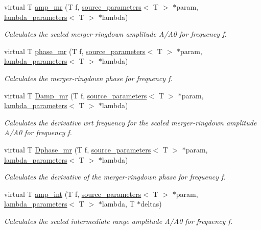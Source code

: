 \begin{DoxyCompactItemize}
virtual T \hyperlink{classIMRPhenomD_ad39d45f582ed9089b3783f7340eac615}{amp\+\_\+mr} (T f, \hyperlink{structsource__parameters}{source\+\_\+parameters}$<$ T $>$ $\ast$param, \hyperlink{structlambda__parameters}{lambda\+\_\+parameters}$<$ T $>$ $\ast$lambda)
\begin{DoxyCompactList}\small\item\em Calculates the scaled merger-\/ringdown amplitude A/\+A0 for frequency f. \end{DoxyCompactList}\item 
virtual T \hyperlink{classIMRPhenomD_a2c9c226afc991458872e36bba204f395}{phase\+\_\+mr} (T f, \hyperlink{structsource__parameters}{source\+\_\+parameters}$<$ T $>$ $\ast$param, \hyperlink{structlambda__parameters}{lambda\+\_\+parameters}$<$ T $>$ $\ast$lambda)
\begin{DoxyCompactList}\small\item\em Calculates the merger-\/ringdown phase for frequency f. \end{DoxyCompactList}\item 
virtual T \hyperlink{classIMRPhenomD_a59796cb7f1ac68684562508a5a83d505}{Damp\+\_\+mr} (T f, \hyperlink{structsource__parameters}{source\+\_\+parameters}$<$ T $>$ $\ast$param, \hyperlink{structlambda__parameters}{lambda\+\_\+parameters}$<$ T $>$ $\ast$lambda)
\begin{DoxyCompactList}\small\item\em Calculates the derivative wrt frequency for the scaled merger-\/ringdown amplitude A/\+A0 for frequency f. \end{DoxyCompactList}\item 
virtual T \hyperlink{classIMRPhenomD_ab4a74828eacee645bac43b0af2c510e1}{Dphase\+\_\+mr} (T f, \hyperlink{structsource__parameters}{source\+\_\+parameters}$<$ T $>$ $\ast$param, \hyperlink{structlambda__parameters}{lambda\+\_\+parameters}$<$ T $>$ $\ast$lambda)
\begin{DoxyCompactList}\small\item\em Calculates the derivative of the merger-\/ringdown phase for frequency f. \end{DoxyCompactList}\item 
virtual T \hyperlink{classIMRPhenomD_a7deef6d5f185eeff45bb7a3357fbd052}{amp\+\_\+int} (T f, \hyperlink{structsource__parameters}{source\+\_\+parameters}$<$ T $>$ $\ast$param, \hyperlink{structlambda__parameters}{lambda\+\_\+parameters}$<$ T $>$ $\ast$lambda, T $\ast$deltas)
\begin{DoxyCompactList}\small\item\em Calculates the scaled intermediate range amplitude A/\+A0 for frequency f. \end{DoxyCompactList}\item 

\end{DoxyCompactItemize}
